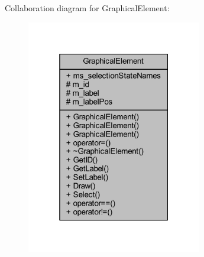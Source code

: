 Collaboration diagram for Graphical\+Element\+:
\nopagebreak
\begin{figure}[H]
\begin{center}
\leavevmode
\includegraphics[width=217pt]{class_graphical_element__coll__graph}
\end{center}
\end{figure}
